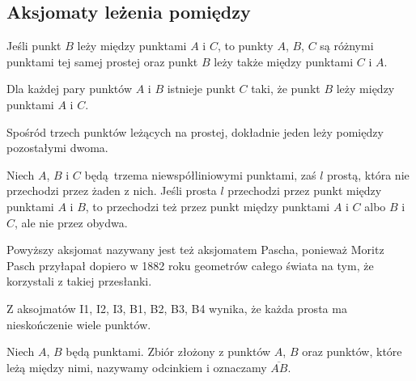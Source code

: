 %

\subsection{Aksjomaty leżenia pomiędzy}
\begin{axiom}
    Jeśli punkt $B$ leży między punktami $A$ i $C$, to punkty $A$, $B$, $C$ są różnymi punktami tej samej prostej oraz punkt $B$ leży także między punktami $C$ i $A$.
\end{axiom}

\begin{axiom}
    Dla każdej pary punktów $A$ i $B$ istnieje punkt $C$ taki, że punkt $B$ leży między punktami $A$ i $C$.
\end{axiom}

\begin{axiom}
    Spośród trzech punktów leżących na prostej, dokładnie jeden leży pomiędzy pozostałymi dwoma.
\end{axiom}

\begin{axiom}
    Niech $A$, $B$ i $C$ będą trzema niewspółliniowymi punktami, zaś $l$ prostą, która nie przechodzi przez żaden z nich.
    Jeśli prosta $l$ przechodzi przez punkt między punktami $A$ i $B$, to przechodzi też przez punkt między punktami $A$ i $C$ albo $B$ i $C$, ale nie przez obydwa.
\end{axiom}

Powyższy aksjomat nazywany jest też aksjomatem Pascha, ponieważ Moritz Pasch \cite{pasch_1882} przyłapał dopiero w 1882 roku geometrów całego świata na tym, że korzystali z takiej przesłanki.
%
%


\begin{proposition}
    Z aksojmatów I1, I2, I3, B1, B2, B3, B4 wynika, że każda prosta ma nieskończenie wiele punktów.
\end{proposition}

\begin{definition}[odcinek]
    Niech $A$, $B$ będą punktami.
    Zbiór złożony z punktów $A$, $B$ oraz punktów, które leżą między nimi, nazywamy odcinkiem i oznaczamy $\overline {AB}$.
\end{definition} %


